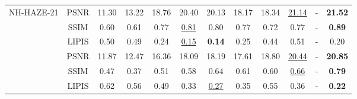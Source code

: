 \documentclass[journal]{IEEEtran}
\begin{document}
\begin{table}
\begin{center}
{\begin{tabular}{ c | c | c | c | c | c | c | c | c | c | c | c }
				\multirow{4}{*}{NH-HAZE-21} & PSNR                    & 11.30                  & 13.22               & 18.76                   & 20.40                & 20.13               & 18.17                      & 18.34                             & \underline{21.14}       & -                                & \textbf{21.52}        \\
				                            & SSIM                    & 0.60                   & 0.61                & 0.77                    & \underline{0.81}     & 0.80                & 0.77                       & 0.72                              & 0.77                    & -                                & \textbf{0.89}         \\
				                            & LIPIS                   & 0.50                   & 0.49                & 0.24                    & \underline{0.15}     & \textbf{0.14}       & 0.25                       & 0.44                              & 0.51                    & -                                & 0.20                  \\
				\hline

				\multirow{4}{*}{NH-HAZE-23} & PSNR                    & 11.87                  & 12.47               & 16.36                   & 18.09                & 18.19               & 17.61                      & 18.80                             & \underline{20.44}       & -                                & \textbf{20.85}        \\
				                            & SSIM                    & 0.47                   & 0.37                & 0.51                    & 0.58                 & 0.64                & 0.61                       & 0.60                              & \underline{0.66}        & -                                & \textbf{0.79}         \\
				                            & LIPIS                   & 0.62                   & 0.56                & 0.49                    & 0.33                 & \underline{0.27}    & 0.35                       & 0.55                              & 0.36                    & -                                & \textbf{0.22}         \\
				\hline
			\end{tabular}
		}

	\end{center}
\end{table}
\end{document}
